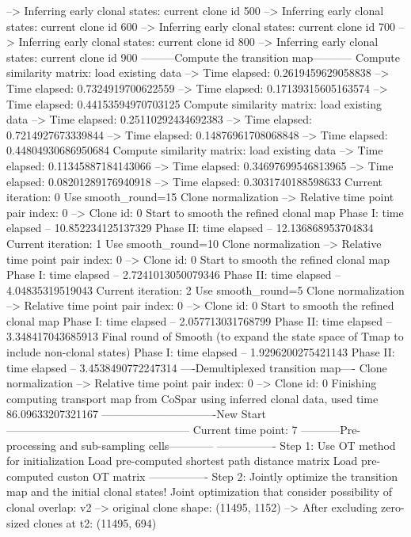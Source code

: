 \documentclass[letterpaper,10pt,english]{sphinxmanual}
\begin{document}
{\begin{sphinxVerbatim}[commandchars=\\\{\}]
--> Inferring early clonal states: current clone id 500
--> Inferring early clonal states: current clone id 600
--> Inferring early clonal states: current clone id 700
--> Inferring early clonal states: current clone id 800
--> Inferring early clonal states: current clone id 900
---------Compute the transition map-----------
Compute similarity matrix: load existing data
--> Time elapsed:  0.2619459629058838
--> Time elapsed:  0.7324919700622559
--> Time elapsed:  0.17139315605163574
--> Time elapsed:  0.44153594970703125
Compute similarity matrix: load existing data
--> Time elapsed:  0.25110292434692383
--> Time elapsed:  0.7214927673339844
--> Time elapsed:  0.14876961708068848
--> Time elapsed:  0.44804930686950684
Compute similarity matrix: load existing data
--> Time elapsed:  0.11345887184143066
--> Time elapsed:  0.34697699546813965
--> Time elapsed:  0.08201289176940918
--> Time elapsed:  0.3031740188598633
Current iteration: 0
Use smooth\_round=15
Clone normalization
--> Relative time point pair index: 0
--> Clone id: 0
Start to smooth the refined clonal map
Phase I: time elapsed --  10.852234125137329
Phase II: time elapsed --  12.136868953704834
Current iteration: 1
Use smooth\_round=10
Clone normalization
--> Relative time point pair index: 0
--> Clone id: 0
Start to smooth the refined clonal map
Phase I: time elapsed --  2.7241013050079346
Phase II: time elapsed --  4.04835319519043
Current iteration: 2
Use smooth\_round=5
Clone normalization
--> Relative time point pair index: 0
--> Clone id: 0
Start to smooth the refined clonal map
Phase I: time elapsed --  2.057713031768799
Phase II: time elapsed --  3.348417043685913
Final round of Smooth (to expand the state space of Tmap to include non-clonal states)
Phase I: time elapsed --  1.9296200275421143
Phase II: time elapsed --  3.4538490772247314
----Demultiplexed transition map----
Clone normalization
--> Relative time point pair index: 0
--> Clone id: 0
Finishing computing transport map from CoSpar using inferred clonal data, used time 86.09633207321167
-------------------------------New Start--------------------------------------------------
Current time point: 7
-----------Pre-processing and sub-sampling cells------------
----------------
Step 1: Use OT method for initialization
Load pre-computed shortest path distance matrix
Load pre-computed custon OT matrix
----------------
Step 2: Jointly optimize the transition map and the initial clonal states!
Joint optimization that consider possibility of clonal overlap: v2
--> original clone shape: (11495, 1152)
--> After excluding zero-sized clones at t2: (11495, 694)

\end{sphinxVerbatim}}
\end{document}
